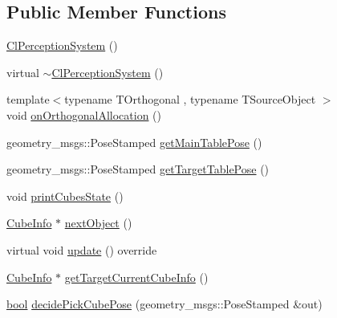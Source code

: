 \subsection*{Public Member Functions}
\begin{DoxyCompactItemize}
\item 
\hyperlink{classsm__moveit__wine__serve_1_1cl__perception__system_1_1ClPerceptionSystem_a94a8d08cdd3f85b5a177d354cffb4ed1}{Cl\+Perception\+System} ()
\item 
virtual \hyperlink{classsm__moveit__wine__serve_1_1cl__perception__system_1_1ClPerceptionSystem_a0557c5c660959ccbb0960f8d081e06cd}{$\sim$\+Cl\+Perception\+System} ()
\item 
{\footnotesize template$<$typename T\+Orthogonal , typename T\+Source\+Object $>$ }\\void \hyperlink{classsm__moveit__wine__serve_1_1cl__perception__system_1_1ClPerceptionSystem_a1122a4f7fc41b29692091265f3b5c5b3}{on\+Orthogonal\+Allocation} ()
\item 
geometry\+\_\+msgs\+::\+Pose\+Stamped \hyperlink{classsm__moveit__wine__serve_1_1cl__perception__system_1_1ClPerceptionSystem_ad9dec4dd1bb5ddebd6ad76ccd6b5bbf0}{get\+Main\+Table\+Pose} ()
\item 
geometry\+\_\+msgs\+::\+Pose\+Stamped \hyperlink{classsm__moveit__wine__serve_1_1cl__perception__system_1_1ClPerceptionSystem_af3691cf60b48afb75b347d38c0285c17}{get\+Target\+Table\+Pose} ()
\item 
void \hyperlink{classsm__moveit__wine__serve_1_1cl__perception__system_1_1ClPerceptionSystem_a873b77957bc9fb25dba500389911ff0c}{print\+Cubes\+State} ()
\item 
\hyperlink{structsm__moveit__wine__serve_1_1cl__perception__system_1_1CubeInfo}{Cube\+Info} $\ast$ \hyperlink{classsm__moveit__wine__serve_1_1cl__perception__system_1_1ClPerceptionSystem_abe32b5f5342f3e9ab6d9d46138ac1fc6}{next\+Object} ()
\item 
virtual void \hyperlink{classsm__moveit__wine__serve_1_1cl__perception__system_1_1ClPerceptionSystem_ac0bee71483d666f6179f243724c3b4a5}{update} () override
\item 
\hyperlink{structsm__moveit__wine__serve_1_1cl__perception__system_1_1CubeInfo}{Cube\+Info} $\ast$ \hyperlink{classsm__moveit__wine__serve_1_1cl__perception__system_1_1ClPerceptionSystem_a13bcd31217e9eda88d966d3ec142a465}{get\+Target\+Current\+Cube\+Info} ()
\item 
\hyperlink{classbool}{bool} \hyperlink{classsm__moveit__wine__serve_1_1cl__perception__system_1_1ClPerceptionSystem_a18e4825d8729ff91f575442f14e507ee}{decide\+Pick\+Cube\+Pose} (geometry\+\_\+msgs\+::\+Pose\+Stamped \&out)

\end{DoxyCompactItemize}
